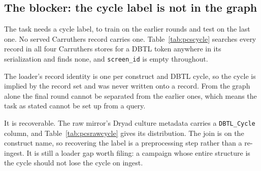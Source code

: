 \clearpage


\subsection{The blocker: the cycle label is not in the graph}\label{sec:iso-cycle}

The task needs a cycle label, to train on the earlier rounds and test on the last one.
No served Carruthers record carries one. Table~\ref{tab:pcscycle} searches every record
in all four Carruthers stores for a DBTL token anywhere in its serialization and finds
none, and \texttt{screen\_id} is empty throughout.

The loader's record identity is one per construct and DBTL cycle, so the cycle is
implied by the record set and was never written onto a record. From the graph alone the
final round cannot be separated from the earlier ones, which means the task as stated
cannot be set up from a query.

It is recoverable. The raw mirror's Dryad culture metadata carries a
\texttt{DBTL\_Cycle} column, and Table~\ref{tab:pcsrawcycle} gives its distribution.
The join is on the construct name, so recovering the label is a preprocessing step
rather than a re-ingest. It is still a loader gap worth filing: a campaign whose entire
structure is the cycle should not lose the cycle on ingest.

\clearpage


\clearpage



